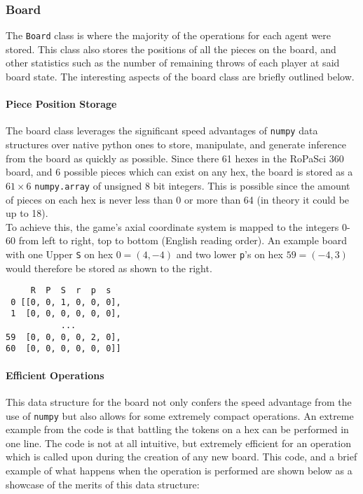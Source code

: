 \documentclass{article}
\begin{document}
\subsubsection{Board}
The \verb|Board| class is where the majority of the operations for each agent were stored. This class also stores the positions of all the pieces on the board, and other statistics such as the number of remaining throws of each player at said board state. The interesting aspects of the board class are briefly outlined below.\\[4mm]
\begin{minipage}{0.73\textwidth}
\paragraph{Piece Position Storage}
The board class leverages the significant speed advantages of \verb|numpy| data structures over native python ones to store, manipulate, and generate inference from the board as quickly as possible. Since there 61 hexes in the RoPaSci 360 board, and 6 possible pieces which can exist on any hex, the board is stored as a $61 \times 6$ \verb|numpy.array| of unsigned 8 bit integers. This is possible since the amount of pieces on each hex is never less than 0 or more than 64 (in theory it could be up to 18).\\[2mm]
To achieve this, the game's axial coordinate system is mapped to the integers 0-60 from left to right, top to bottom (English reading order). An example board with one Upper \verb|S| on hex $0 = (4, -4)$ and two lower \verb|p|'s on hex $59 = (-4, 3)$ would therefore be stored as shown to the right.
\end{minipage}
\hfill
\begin{minipage}{0.25\textwidth}
\begin{verbatim}
     R  P  S  r  p  s
 0 [[0, 0, 1, 0, 0, 0],
 1  [0, 0, 0, 0, 0, 0],
           ...
59  [0, 0, 0, 0, 2, 0],
60  [0, 0, 0, 0, 0, 0]]
\end{verbatim}
\end{minipage}
\paragraph{Efficient Operations}
This data structure for the board not only confers the speed advantage from the use of \verb|numpy| but also allows for some extremely compact operations. An extreme example from the code is that battling the tokens on a hex can be performed in one line. The code is not at all intuitive, but extremely efficient for an operation which is called upon during the creation of any new board. This code, and a brief example of what happens when the operation is performed are shown below as a showcase of the merits of this data structure:
\end{document}
